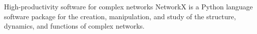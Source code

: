 High-productivity software for complex networks
NetworkX is a Python language software package for the creation, manipulation, and study of the structure, dynamics, and functions of complex networks.
